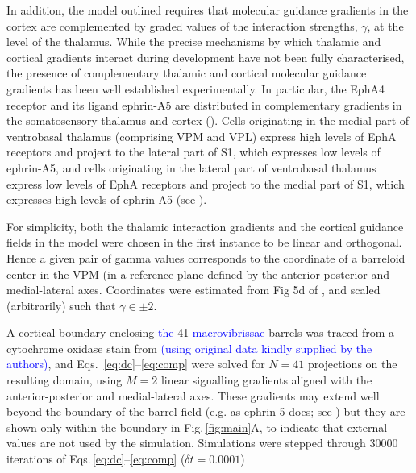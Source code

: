 \documentclass[9pt,lineno]{elife}
\newcommand{\cmnt}[1]{\textcolor{blue}{#1}}
\newcommand{\MPone}[1]{\textcolor{revpink}{#1}}
\newcommand{\mpfour}[1]{\textcolor{revgreen}{#1}}
\begin{document}
\MPone{In addition, the model outlined requires that molecular
  guidance gradients in the cortex are complemented by graded values of the
  interaction strengths, $\gamma$, at the level of the thalamus. While the
  precise mechanisms by which thalamic and cortical gradients interact during
  development have not been fully characterised, the presence of complementary
  thalamic and cortical molecular guidance gradients has been well established
  experimentally. In particular, the EphA4 receptor and its ligand ephrin-A5
  are distributed in complementary gradients in the somatosensory thalamus and
  cortex} (\citealp{vanderhaeghen_mapping_2000,miller_epha7-ephrin-a5_2006}).
\MPone{Cells originating in the medial part of ventrobasal thalamus
  (comprising VPM and VPL) express high levels of EphA receptors and project
  to the lateral part of S1, which expresses low levels of ephrin-A5, and
  cells originating in the lateral part of ventrobasal thalamus express low
  levels of EphA receptors and project to the medial part of S1, which
  expresses high levels of ephrin-A5} (see
\citealp{gao_regulation_1998,dufour_area_2003,vanderhaeghen_developmental_2004,speer_grading_2005,torii_role_2013}).

\MPone{For simplicity, both the thalamic interaction gradients and the
  cortical guidance fields in the model were chosen in the first instance to
  be linear and orthogonal. Hence a given pair of gamma values corresponds to
  the coordinate of a barreloid center in the VPM (in a reference plane
  defined by the anterior-posterior and medial-lateral axes. Coordinates were
  estimated from Fig 5d of} \citep{haidarliu_size_2001}, \MPone{and
  scaled (arbitrarily) such that $\gamma\in\pm 2$.}

A cortical boundary enclosing \cmnt{the} 41 \cmnt{macrovibrissae} barrels was
traced from a cytochrome oxidase stain from \cite{zheng_signal_2001}
\cmnt{(using original data kindly supplied by the authors)}, and
Eqs.~\ref{eq:dc}--\ref{eq:comp} were solved for $N=41$ projections on the
resulting domain, using $M=2$ linear signalling gradients aligned with the
anterior-posterior and medial-lateral axes.  \mpfour{These gradients may
  extend well beyond the boundary of the barrel field (e.g. as ephrin-5 does;
  see \citealp{miller_epha7-ephrin-a5_2006}) but they are shown only within
  the boundary in Fig.\,\ref{fig:main}A, to indicate that external values are
  not used by the simulation. Simulations were stepped through 30000
  iterations of Eqs.\,\ref{eq:dc}--\ref{eq:comp} ($\delta t=0.0001$)}
\end{document}
